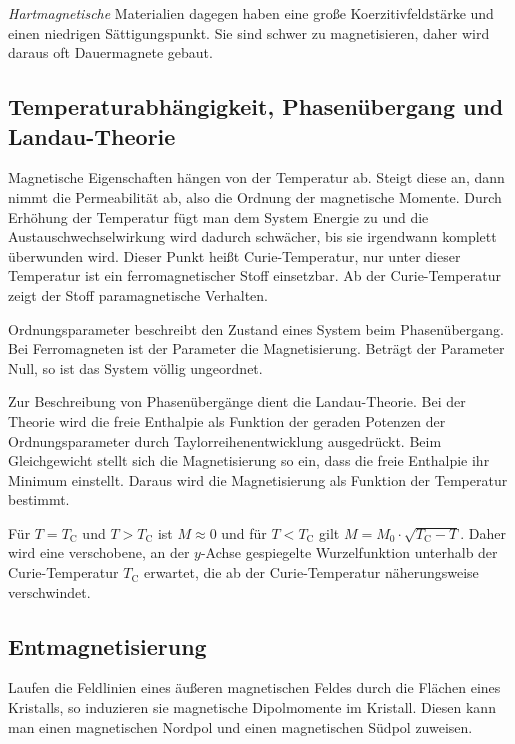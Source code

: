 \documentclass[12pt,a4paper]{scrartcl}
\numberwithin{equation}{section} %
\begin{document}
\emph{Hartmagnetische} Materialien dagegen haben eine große Koerzitivfeldstärke und einen niedrigen Sättigungspunkt. Sie sind schwer zu magnetisieren, daher wird daraus oft Dauermagnete gebaut.

\hypertarget{temperaturabhuxe4ngigkeit-phasenuxfcbergang-und-landau-theorie}{%
\subsection{Temperaturabhängigkeit, Phasenübergang und Landau-Theorie}\label{temperaturabhuxe4ngigkeit-phasenuxfcbergang-und-landau-theorie}}
Magnetische Eigenschaften hängen von der Temperatur ab. Steigt diese an, dann nimmt die Permeabilität ab, also die Ordnung der magnetische Momente. Durch Erhöhung der Temperatur fügt man dem System Energie zu und die Austauschwechselwirkung wird dadurch schwächer, bis sie irgendwann komplett überwunden wird. Dieser Punkt heißt Curie-Temperatur, nur unter dieser Temperatur ist ein ferromagnetischer Stoff einsetzbar. Ab der Curie-Temperatur zeigt der Stoff paramagnetische Verhalten.

Ordnungsparameter beschreibt den Zustand eines System beim Phasenübergang. Bei Ferromagneten ist der Parameter die Magnetisierung. Beträgt der Parameter Null, so ist das System völlig ungeordnet.

Zur Beschreibung von Phasenübergänge dient die Landau-Theorie. Bei der Theorie wird die freie Enthalpie als Funktion der geraden Potenzen der Ordnungsparameter durch Taylorreihenentwicklung ausgedrückt. Beim Gleichgewicht stellt sich die Magnetisierung so ein, dass die freie Enthalpie ihr Minimum einstellt. Daraus wird die Magnetisierung als Funktion der Temperatur bestimmt.

Für $T=T_\mathrm{C}$ und $T > T_\mathrm{C}$ ist $M\approx 0$ und für $T < T_\mathrm{C}$ gilt $M = M_0 \cdot \sqrt{T_\mathrm{C} - T}$. Daher wird eine verschobene, an der $y$-Achse gespiegelte Wurzelfunktion unterhalb der Curie-Temperatur $T_\mathrm{C}$ erwartet, die ab der Curie-Temperatur näherungsweise verschwindet.

\hypertarget{entmagnetisierung}{%
\subsection{Entmagnetisierung}\label{entmagnetisierung}}

Laufen die Feldlinien eines äußeren magnetischen Feldes durch die Flächen eines Kristalls, so induzieren sie magnetische Dipolmomente im Kristall. Diesen kann man einen magnetischen Nordpol und einen magnetischen Südpol zuweisen.
\end{document}
